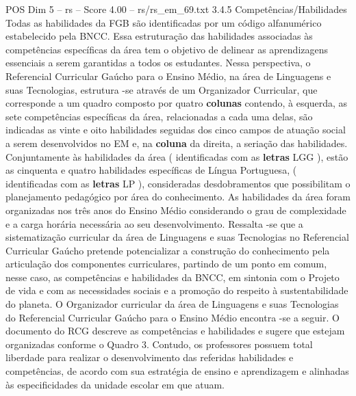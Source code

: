 \begin{textsample}{POS Dim 5 – rs – Score 4.00 – rs/rs\_em\_69.txt}  \label{ex:f5_pos_267}
3.4.5 Competências/Habilidades Todas as habilidades da FGB são identificadas por um código alfanumérico estabelecido pela BNCC.
Essa estruturação das habilidades associadas às competências específicas da área tem o objetivo de delinear as aprendizagens essenciais a serem garantidas a todos os estudantes.
Nessa perspectiva, o Referencial Curricular Gaúcho para o Ensino Médio, na área de Linguagens e suas Tecnologias, estrutura -se através de um Organizador Curricular, que corresponde a um quadro composto por quatro \textbf{colunas} contendo, à esquerda, as sete competências específicas da área, relacionadas a cada uma delas, são indicadas as vinte e oito habilidades seguidas dos cinco campos de atuação social a serem desenvolvidos no EM e, na \textbf{coluna} da direita, a seriação das habilidades.
Conjuntamente às habilidades da área ( identificadas com as \textbf{letras} LGG ), estão as cinquenta e quatro habilidades específicas de Língua Portuguesa, ( identificadas com as \textbf{letras} LP ), consideradas desdobramentos que possibilitam o planejamento pedagógico por área do conhecimento.
As habilidades da área foram organizadas nos três anos do Ensino Médio considerando o grau de complexidade e a carga horária necessária ao seu desenvolvimento.
Ressalta -se que a sistematização curricular da área de Linguagens e suas Tecnologias no Referencial Curricular Gaúcho pretende potencializar a construção do conhecimento pela articulação dos componentes curriculares, partindo de um ponto em comum, nesse caso, as competências e habilidades da BNCC, em sintonia com o Projeto de vida e com as necessidades sociais e a promoção do respeito à sustentabilidade do planeta.
O Organizador curricular da área de Linguagens e suas Tecnologias do Referencial Curricular Gaúcho para o Ensino Médio encontra -se a seguir.
O documento do RCG descreve as competências e habilidades e sugere que estejam organizadas conforme o Quadro 3.
Contudo, os professores possuem total liberdade para realizar o desenvolvimento das referidas habilidades e competências, de acordo com sua estratégia de ensino e aprendizagem e alinhadas às especificidades da unidade escolar em que atuam.

\end{textsample}

